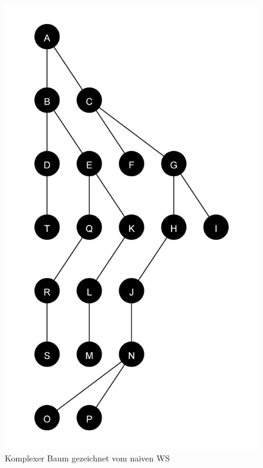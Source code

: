 \begin{figure}[ht]
    \centering
    \includegraphics[scale = 0.18]{abbildungen/komplex_a1}
    \caption{Komplexer Baum gezeichnet vom naiven \ac{WS}}
    \label{pic:komplex_a1}
\end{figure}


